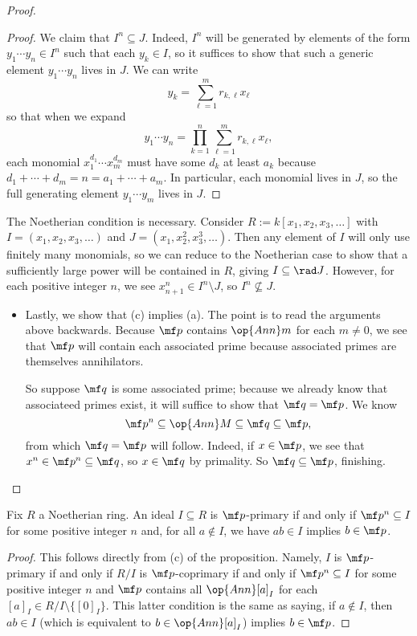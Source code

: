 \begin{proof}
\begin{proof}
		We claim that $I^n\subseteq J$. Indeed, $I^n$ will be generated by elements of the form $y_1\cdots y_n\in I^n$ such that each $y_k\in I$, so it suffices to show that such a generic element $y_1\cdots y_n$ lives in $J$. We can write
		\[y_k=\sum_{\ell=1}^mr_{k,\ell}x_\ell\]
		so that when we expand
		\[y_1\cdots y_n=\prod_{k=1}^n\sum_{\ell=1}^mr_{k,\ell}x_\ell,\]
		each monomial $x_1^{d_1}\cdots x_m^{d_m}$ must have some $d_k$ at least $a_k$ because $d_1+\cdots+d_m=n=a_1+\cdots+a_m$. In particular, each monomial lives in $J$, so the full generating element $y_1\cdots y_m$ lives in $J$.
	\end{proof}
	\begin{remark}[Nir]
		The Noetherian condition is necessary. Consider $R:=k[x_1,x_2,x_3,\ldots]$ with $I=(x_1,x_2,x_3,\ldots)$ and $J=\left(x_1,x_2^2,x_3^3,\ldots\right)$. Then any element of $I$ will only use finitely many monomials, so we can reduce to the Noetherian case to show that a sufficiently large power will be contained in $R$, giving $I\subseteq\rad J$. However, for each positive integer $n$, we see $x_{n+1}^n\in I^n\setminus J$, so $I^n\not\subseteq J$.
	\end{remark}
	\begin{itemize}
		\item Lastly, we show that (c) implies (a). The point is to read the arguments above backwards. Because $\mf p$ contains $\op{Ann}m$ for each $m\ne0$, we see that $\mf p$ will contain each associated prime because associated primes are themselves annihilators.

		So suppose $\mf q$ is some associated prime; because we already know that associateed primes exist, it will suffice to show that $\mf q=\mf p$. We know
		\[\mf p^n\subseteq\op{Ann}M\subseteq\mf q\subseteq\mf p,\]
		from which $\mf q=\mf p$ will follow. Indeed, if $x\in\mf p$, we see that $x^n\in\mf p^n\subseteq\mf q$, so $x\in\mf q$ by primality. So $\mf q\subseteq\mf p$, finishing.
		\qedhere
	\end{itemize}
\end{proof}
\begin{corollary}
	Fix $R$ a Noetherian ring. An ideal $I\subseteq R$ is $\mf p$-primary if and only if $\mf p^n\subseteq I$ for some positive integer $n$ and, for all $a\notin I$, we have $ab\in I$ implies $b\in\mf p$.
\end{corollary}
\begin{proof}
	This follows directly from (c) of the proposition. Namely, $I$ is $\mf p$-primary if and only if $R/I$ is $\mf p$-coprimary if and only if $\mf p^n\subseteq I$ for some positive integer $n$ and $\mf p$ contains all $\op{Ann}[a]_I$ for each $[a]_I\in R/I\setminus\{[0]_I\}$. This latter condition is the same as saying, if $a\notin I$, then $ab\in I$ (which is equivalent to $b\in\op{Ann}[a]_I$) implies $b\in\mf p$.
\end{proof}
